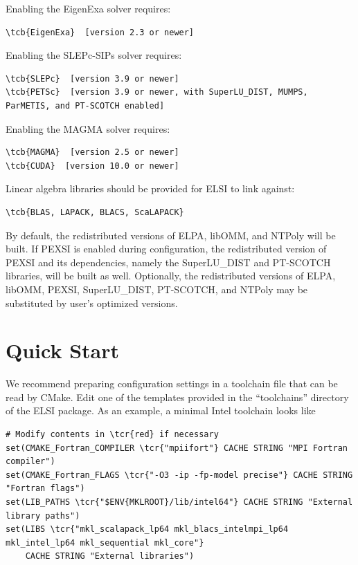 \documentclass{report}
\newcommand{\tcb}[1]{\textcolor{blue}{#1}}
\newcommand{\tcr}[1]{\textcolor{red}{#1}}
\begin{document}
Enabling the EigenExa solver requires:
\begin{Verbatim}[commandchars=\\\{\}]
\tcb{EigenExa}  [version 2.3 or newer]
\end{Verbatim}

Enabling the SLEPc-SIPs solver requires:
\begin{Verbatim}[commandchars=\\\{\}]
\tcb{SLEPc}  [version 3.9 or newer]
\tcb{PETSc}  [version 3.9 or newer, with SuperLU_DIST, MUMPS, ParMETIS, and PT-SCOTCH enabled]
\end{Verbatim}

Enabling the MAGMA solver requires:
\begin{Verbatim}[commandchars=\\\{\}]
\tcb{MAGMA}  [version 2.5 or newer]
\tcb{CUDA}  [version 10.0 or newer]
\end{Verbatim}

Linear algebra libraries should be provided for ELSI to link against:
\begin{Verbatim}[commandchars=\\\{\}]
\tcb{BLAS, LAPACK, BLACS, ScaLAPACK}
\end{Verbatim}

By default, the redistributed versions of ELPA, libOMM, and NTPoly will be built. If PEXSI is enabled during configuration, the redistributed version of PEXSI and its dependencies, namely the SuperLU\_DIST and PT-SCOTCH libraries, will be built as well. Optionally, the redistributed versions of ELPA, libOMM, PEXSI, SuperLU\_DIST, PT-SCOTCH, and NTPoly may be substituted by user's optimized versions.

\section{Quick Start}
\label{sec:quick}
We recommend preparing configuration settings in a toolchain file that can be read by CMake. Edit one of the templates provided in the ``toolchains'' directory of the ELSI package. As an example, a minimal Intel toolchain looks like
\begin{tcolorbox}
\begin{Verbatim}[commandchars=\\\{\}]
# Modify contents in \tcr{red} if necessary
set(CMAKE_Fortran_COMPILER \tcr{"mpiifort"} CACHE STRING "MPI Fortran compiler")
set(CMAKE_Fortran_FLAGS \tcr{"-O3 -ip -fp-model precise"} CACHE STRING "Fortran flags")
set(LIB_PATHS \tcr{"$ENV{MKLROOT}/lib/intel64"} CACHE STRING "External library paths")
set(LIBS \tcr{"mkl_scalapack_lp64 mkl_blacs_intelmpi_lp64 mkl_intel_lp64 mkl_sequential mkl_core"}
    CACHE STRING "External libraries")
\end{Verbatim}
\end{tcolorbox}
\end{document}
